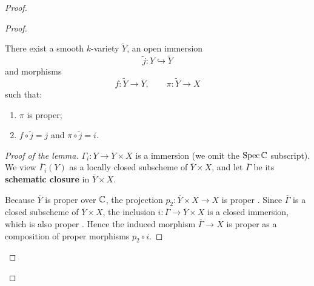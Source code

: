 \begin{remark}
\begin{proof}
\begin{enumerate}
\begin{proof}
                      \begin{lemma}
                          There exist a smooth $k$-variety $\widetilde Y$, an open immersion
                          \[
                              \widetilde j:Y\hookrightarrow \widetilde Y
                          \]
                          and morphisms
                          \[
                              f:\widetilde Y\to \overline Y,\qquad \pi:\widetilde Y\to X
                          \]
                          such that:
                          \begin{enumerate}
                              \item $\pi$ is proper;
                              \item $f\circ \widetilde j = j$ and $\pi\circ \widetilde j = i$.
                          \end{enumerate}
                      \end{lemma}

                      \begin{proof}[Proof of the lemma]

                          $\Gamma_i:Y\to Y\times X$ is a immersion (we omit the $\operatorname{Spec} \mathbb{C}$ subscript).
                          We view $\overline{\Gamma}_i(Y)$ as a locally closed subscheme of $\overline Y\times X$,
                          and let $\overline{\Gamma}$ be its \textbf{schematic closure} \cite[\href{https://stacks.math.columbia.edu/tag/01R8}{Tag 01R8}]{stacks-project} in $\overline Y\times X$.

                          Because $\overline Y$ is proper over $\mathbb{C}$, the projection $p_2:\overline Y\times X\to X$ is proper \cite[\href{https://stacks.math.columbia.edu/tag/01W5}{Tag 01W5}, \href{https://stacks.math.columbia.edu/tag/01W6}{Tag 01W6}]{stacks-project}.
                          Since $\overline{\Gamma}$ is a closed subscheme of $\overline Y\times X$, the inclusion $i:\overline{\Gamma} \to \overline Y \times X$ is a closed immersion, which is also proper \cite[\href{https://stacks.math.columbia.edu/tag/01W5}{Tag 01W5}]{stacks-project}.
                          Hence the induced morphism $\overline{\Gamma}\to X$ is proper as a composition of proper morphisms $p_2\circ i$.


\end{proof}
\end{proof}
\end{enumerate}
\end{proof}
\end{remark}
